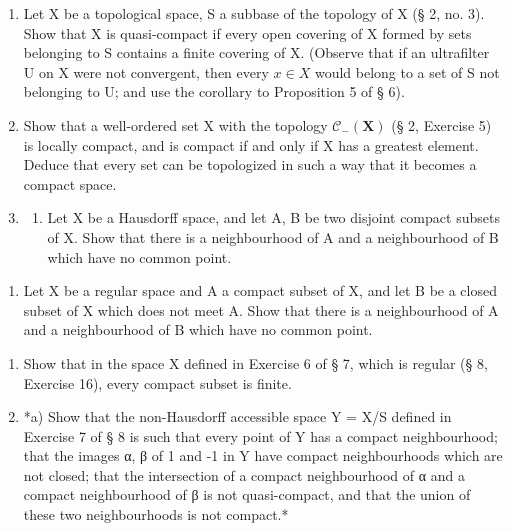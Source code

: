 \BourbakiExerciseGroup

\begin{enumerate}
\def\labelenumi{\arabic{enumi})}
\item
  Let X be a topological space, S a subbase of the topology of X (§ 2, no. 3). Show that X is quasi-compact if every open covering of X formed by sets belonging to S contains a finite covering of X. (Observe that if an ultrafilter U on X were not convergent, then every \(x \in X\) would belong to a set of S not belonging to U; and use the corollary to Proposition 5 of § 6).
\item
  Show that a well-ordered set X with the topology \(\mathcal{C}_{-}(\mathbf{X})\) (§ 2, Exercise 5) is locally compact, and is compact if and only if X has a greatest element. Deduce that every set can be topologized in such a way that it becomes a compact space.
\item
  \begin{enumerate}
  \def\labelenumii{\alph{enumii})}
  \tightlist
  \item
    Let X be a Hausdorff space, and let A, B be two disjoint compact subsets of X. Show that there is a neighbourhood of A and a neighbourhood of B which have no common point.
  \end{enumerate}
\end{enumerate}

\begin{enumerate}
\def\labelenumi{\alph{enumi})}
\setcounter{enumi}{1}
\tightlist
\item
  Let X be a regular space and A a compact subset of X, and let B be a closed subset of X which does not meet A. Show that there is a neighbourhood of A and a neighbourhood of B which have no common point.
\end{enumerate}

\begin{enumerate}
\def\labelenumi{\arabic{enumi})}
\setcounter{enumi}{3}
\item
  Show that in the space X defined in Exercise 6 of § 7, which is regular (§ 8, Exercise 16), every compact subset is finite.
\item
  *a) Show that the non-Hausdorff accessible space Y = X/S defined in Exercise 7 of § 8 is such that every point of Y has a compact neighbourhood; that the images α, β of 1 and -1 in Y have compact neighbourhoods which are not closed; that the intersection of a compact neighbourhood of α and a compact neighbourhood of β is not quasi-compact, and that the union of these two neighbourhoods is not compact.*
\end{enumerate}

